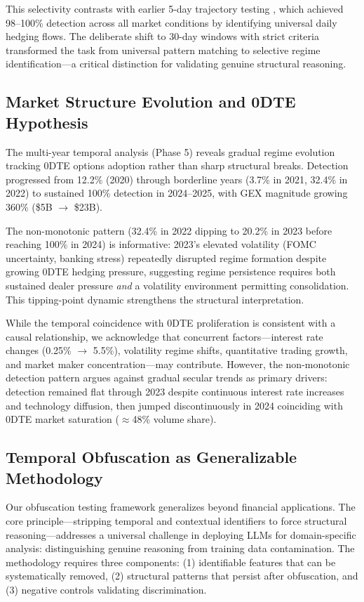 This selectivity contrasts with earlier 5-day trajectory testing \citep{regan2025obfuscation}, which achieved 98--100\% detection across all market conditions by identifying universal daily hedging flows. The deliberate shift to 30-day windows with strict criteria transformed the task from universal pattern matching to selective regime identification---a critical distinction for validating genuine structural reasoning.

\subsection{Market Structure Evolution and 0DTE Hypothesis}

The multi-year temporal analysis (Phase 5) reveals gradual regime evolution tracking 0DTE options adoption rather than sharp structural breaks. Detection progressed from 12.2\% (2020) through borderline years (3.7\% in 2021, 32.4\% in 2022) to sustained 100\% detection in 2024--2025, with GEX magnitude growing 360\% (\$5B $\rightarrow$ \$23B).

The non-monotonic pattern (32.4\% in 2022 dipping to 20.2\% in 2023 before reaching 100\% in 2024) is informative: 2023's elevated volatility (FOMC uncertainty, banking stress) repeatedly disrupted regime formation despite growing 0DTE hedging pressure, suggesting regime persistence requires both sustained dealer pressure \textit{and} a volatility environment permitting consolidation. This tipping-point dynamic strengthens the structural interpretation.

While the temporal coincidence with 0DTE proliferation is consistent with a causal relationship, we acknowledge that concurrent factors---interest rate changes (0.25\% $\rightarrow$ 5.5\%), volatility regime shifts, quantitative trading growth, and market maker concentration---may contribute. However, the non-monotonic detection pattern argues against gradual secular trends as primary drivers: detection remained flat through 2023 despite continuous interest rate increases and technology diffusion, then jumped discontinuously in 2024 coinciding with 0DTE market saturation ($\approx$48\% volume share).

\subsection{Temporal Obfuscation as Generalizable Methodology}

Our obfuscation testing framework generalizes beyond financial applications. The core principle---stripping temporal and contextual identifiers to force structural reasoning---addresses a universal challenge in deploying LLMs for domain-specific analysis: distinguishing genuine reasoning from training data contamination. The methodology requires three components: (1) identifiable features that can be systematically removed, (2) structural patterns that persist after obfuscation, and (3) negative controls validating discrimination.

